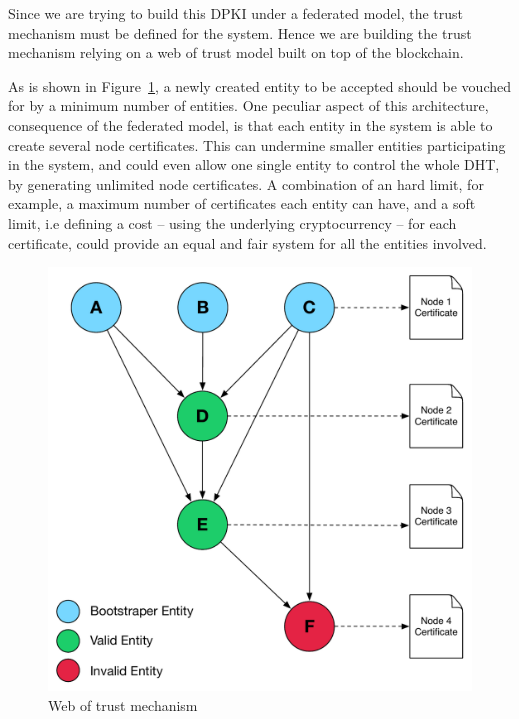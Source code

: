 Since we are trying to build this \ac{DPKI} under a federated model, the trust mechanism must be defined for the system.
Hence we are building the trust mechanism relying on a web of trust model built on top of the blockchain.

As is shown in Figure~\ref{fig:web-of-trust-architecture}, a newly created entity to be accepted should be vouched for by a minimum number of entities.
One peculiar aspect of this architecture, consequence of the federated model, is that each entity in the system is able to create several node certificates.
This can undermine smaller entities participating in the system, and could even allow one single entity to control the whole \ac{DHT}, by generating unlimited node certificates.
A combination of an hard limit, for example, a maximum number of certificates each entity can have, and a soft limit, i.e defining a cost – using the underlying cryptocurrency – for each certificate, could provide an equal and fair system for all the entities involved.

\begin{figure}[htb]
  \centering
  \includegraphics[scale=0.5]{Figures/web-trust-main.pdf}
  \caption{Web of trust mechanism}
\label{fig:web-of-trust-architecture}
\end{figure}

